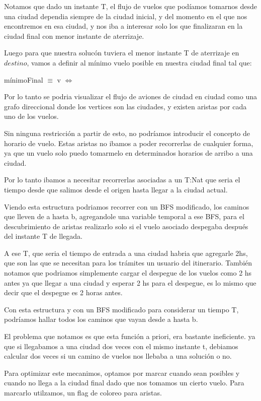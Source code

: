 Notamos que dado un instante T, el flujo de vuelos que pod\'iamos tomarnos desde una ciudad dependia siempre de la ciudad inicial, y del momento en el que nos encontremos en esa ciudad, y nos iba a interesar solo los que finalizaran en la ciudad final con menor instante de aterrizaje.

Luego para que nuestra soluc\'on tuviera el menor instante T de aterrizaje en $destino$, vamos a definir al m\'inimo vuelo posible en nuestra ciudad final tal que:

m\'inimoFinal $\equiv$ v $\Leftrightarrow$ 


Por lo tanto se podria visualizar el flujo de aviones de ciudad en ciudad como una grafo direccional donde los vertices son las ciudades, y existen aristas por cada uno de los vuelos. 

Sin ninguna restricci\'on a partir de esto, no podr\'iamos introducir el concepto de horario de vuelo.
Estas aristas no ibamos a poder recorrerlas de cualquier forma, ya que un vuelo solo puedo tomarmelo en determinados horarios de arribo a una ciudad. 

Por lo tanto ibamos a necesitar recorrerlas asociadas a un T:Nat que seria el tiempo desde que salimos desde el origen hasta llegar a la ciudad actual.

Viendo esta estructura podriamos recorrer con un BFS modificado, los caminos que lleven de a hasta b, agregandole una variable temporal a ese BFS, para el descubrimiento de aristas realizarlo solo si el vuelo asociado despegaba despu\'es del instante T de llegada.

A ese T, que seria el tiempo de entrada a una ciudad habria que agregarle 2hs, que son las que se necesitan para los tr\'amites un usuario del itinerario. Tambi\'en notamos que podriamos simplemente cargar el despegue de los vuelos como 2 hs antes ya que llegar a una ciudad y esperar 2 hs para el despegue, es lo mismo que decir que el despegue es 2 horas antes.

Con esta estructura y con un BFS modificado para considerar un tiempo T, podr\'iamos hallar todos los caminos que vayan desde a hasta b. 

El problema que notamos es que esta funci\'on a priori, era bastante ineficiente. ya que si llegabamos a una ciudad dos veces con el mismo instante t, debiamos calcular dos veces si un camino de vuelos nos llebaba a una soluci\'on o no.

Para optimizar este mecanimos, optamos por marcar cuando sean posibles y cuando no llega a la ciudad final dado que nos tomamos un cierto vuelo. Para marcarlo utilzamos, un flag de coloreo para aristas.

